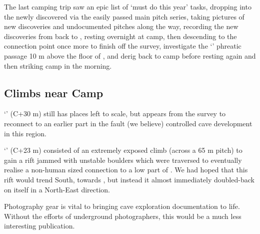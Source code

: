 The last camping trip saw an epic list of `must do this year' tasks,
dropping into the newly discovered  via the
easily passed main pitch series, taking pictures of new discoveries and
undocumented pitches along the way, recording the new discoveries from
 back to , resting overnight at
camp, then descending to the connection point once more to finish off
the survey, investigate the `' phreatic passage 10 m
above the floor of , and derig back to camp before
resting again and then striking camp in the morning.

\subsection{Climbs near Camp}

`' (C+30 m) still has places left to scale, but appears
from the survey to reconnect to an earlier part in the fault (we
believe) controlled cave development in this region.

`' (C+23 m) consisted of an extremely exposed climb (across a
65 m pitch) to gain a rift jammed with unstable boulders which were
traversed to eventually realise a non-human sized connection to a low
part of . We had hoped that this rift would trend
South, towards , but instead it almost immediately doubled-back on
itself in a North-East direction.


    \begin{marginfigure}
\checkoddpage \ifoddpage \forcerectofloat \else \forceversofloat \fi
\centering
 \caption{Photography gear is vital to bringing cave exploration documentation to life. Without the efforts of underground photographers, this would be a much less interesting publication. }
 \label{photo kit 2009}
\end{marginfigure}



